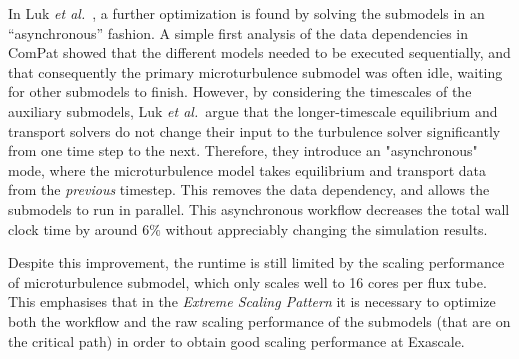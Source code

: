 In Luk \emph{et al.}\ \cite{Lu19ComP}, a further optimization is found by solving
the submodels in an ``asynchronous'' fashion.
A simple first analysis of the data dependencies in ComPat showed that the
different models needed to be executed sequentially, and that consequently the
primary microturbulence submodel was often idle, waiting for other submodels to
finish.
However, by considering the timescales of the auxiliary submodels, Luk \emph{et
al.}\ argue that the longer-timescale equilibrium and transport solvers do not
change their input to the turbulence solver significantly from one time step to
the next.
Therefore, they introduce an "asynchronous" mode, where the microturbulence
model takes equilibrium and transport data from the \emph{previous} timestep. 
This removes the data dependency, and allows the submodels to run in parallel.
This asynchronous workflow decreases the total wall clock time by around $6\%$
without appreciably changing the simulation results.

Despite this improvement, the runtime is still limited by the scaling
performance of microturbulence submodel, which only scales well to 16 cores per
flux tube.
This emphasises that in the {\it Extreme Scaling Pattern} it is necessary to optimize
both the workflow and the raw scaling performance of the submodels (that are on
the critical path) in order to obtain good scaling performance at Exascale.

